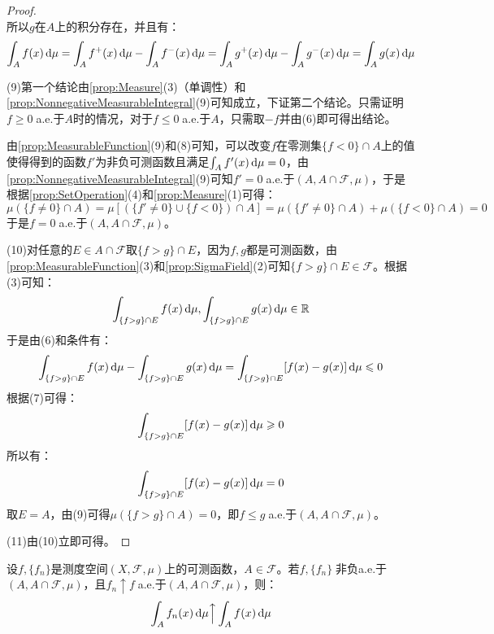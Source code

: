 \begin{proof}
\begin{equation*}
	\end{equation*}
	所以$g$在$A$上的积分存在，并且有：
	\begin{equation*}
		\int_{A}f(x)\mathop{}\!\mathrm{d}\mu=\int_{A}f^+(x)\mathop{}\!\mathrm{d}\mu-\int_{A}f^-(x)\mathop{}\!\mathrm{d}\mu=\int_{A}g^+(x)\mathop{}\!\mathrm{d}\mu-\int_{A}g^-(x)\mathop{}\!\mathrm{d}\mu=\int_{A}g(x)\mathop{}\!\mathrm{d}\mu
	\end{equation*}\par
	(9)第一个结论由\cref{prop:Measure}(3)（单调性）和\cref{prop:NonnegativeMeasurableIntegral}(9)可知成立，下证第二个结论。只需证明$f\geqslant0\;$a.e.于$A$时的情况，对于$f\leqslant0\;$a.e.于$A$，只需取$-f$并由(6)即可得出结论。\par 
	由\cref{prop:MeasurableFunction}(9)和(8)可知，可以改变$f$在零测集$\{f<0\}\cap A$上的值使得得到的函数$f'$为非负可测函数且满足$\int_{A}f'(x)\mathop{}\!\mathrm{d}\mu=0$，由\cref{prop:NonnegativeMeasurableIntegral}(9)可知$f'=0\;$a.e.于$(A,A\cap\mathscr{F},\mu)$，于是根据\cref{prop:SetOperation}(4)和\cref{prop:Measure}(1)可得：
	\begin{equation*}
		\mu(\{f\ne0\}\cap A)=\mu[(\{f'\ne0\}\cup\{f<0\})\cap A]=\mu(\{f'\ne0\}\cap A)+\mu(\{f<0\}\cap A)=0
	\end{equation*}
	于是$f=0\;$a.e.于$(A,A\cap\mathscr{F},\mu)$。\par
	(10)对任意的$E\in A\cap\mathscr{F}$取$\{f>g\}\cap E$，因为$f,g$都是可测函数，由\cref{prop:MeasurableFunction}(3)和\cref{prop:SigmaField}(2)可知$\{f>g\}\cap E\in\mathscr{F}$。根据(3)可知：
	\begin{equation*}
		\int_{\{f>g\}\cap E}f(x)\mathop{}\!\mathrm{d}\mu,\int_{\{f>g\}\cap E}g(x)\mathop{}\!\mathrm{d}\mu\in\mathbb{R}
	\end{equation*}
	于是由(6)和条件有：
	\begin{equation*}
		\int_{\{f>g\}\cap E}f(x)\mathop{}\!\mathrm{d}\mu-\int_{\{f>g\}\cap E}g(x)\mathop{}\!\mathrm{d}\mu=\int_{\{f>g\}\cap E}[f(x)-g(x)]\mathop{}\!\mathrm{d}\mu\leqslant0
	\end{equation*}
	根据(7)可得：
	\begin{equation*}
		\int_{\{f>g\}\cap E}[f(x)-g(x)]\mathop{}\!\mathrm{d}\mu\geqslant0
	\end{equation*}
	所以有：
	\begin{equation*}
		\int_{\{f>g\}\cap E}[f(x)-g(x)]\mathop{}\!\mathrm{d}\mu=0
	\end{equation*}
	取$E=A$，由(9)可得$\mu(\{f>g\}\cap A)=0$，即$f\leqslant g\;$a.e.于$(A,A\cap \mathscr{F},\mu)$。\par
	(11)由(10)立即可得。
\end{proof}
\begin{theorem}\label{theo:LeviTheorem}
	设$f,\{f_n\}$是测度空间$(X,\mathscr{F},\mu)$上的可测函数，$A\in\mathscr{F}$。若$f,\{f_n\}\;$非负a.e.于$(A,A\cap\mathscr{F},\mu)$，且$f_n\uparrow f\;$a.e.于$(A,A\cap\mathscr{F},\mu)$，则：
	\begin{equation*}
		\int_{A}f_n(x)\mathop{}\!\mathrm{d}\mu\Big\uparrow\int_{A}f(x)\mathop{}\!\mathrm{d}\mu
	\end{equation*}
\end{theorem}
